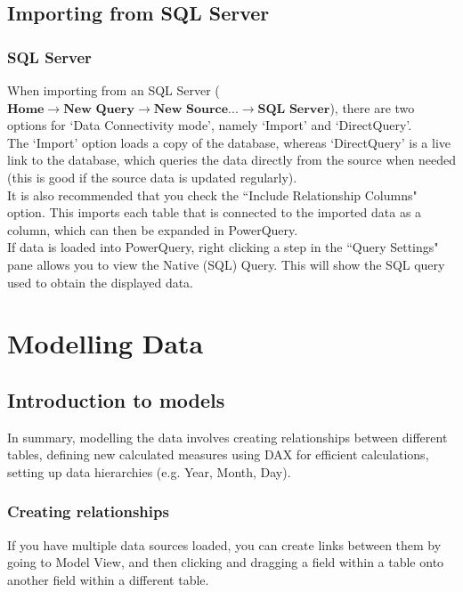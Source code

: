 \documentclass[10pt, openany, twocolumn]{book}
\begin{document}
\section{Importing from SQL Server}

\subsection*{SQL Server}

When importing from an SQL Server ($\textbf{Home} \rightarrow \textbf{New Query} \rightarrow \textbf{New Source...} \rightarrow \textbf{SQL Server}$), there are two options for `Data Connectivity mode', namely `Import' and `DirectQuery'. \\

The `Import' option loads a copy of the database, whereas `DirectQuery' is a live link to the database, which queries the data directly from the source when needed (this is good if the source data is updated regularly). \\

It is also recommended that you check the ``Include Relationship Columns" option. This imports each table that is connected to the imported data as a column, which can then be expanded in PowerQuery.\\

If data is loaded into PowerQuery, right clicking a step in the ``Query Settings" pane allows you to view the Native (SQL) Query. This will show the SQL query used to obtain the displayed data.

\chapter{Modelling Data}

\section{Introduction to models}

In summary, modelling the data involves creating relationships between different tables, defining new calculated measures using DAX for efficient calculations, setting up data hierarchies (e.g. Year, Month, Day).

\subsection*{Creating relationships}

If you have multiple data sources loaded, you can create links between them by going to Model View, and then clicking and dragging a field within a table onto another field within a different table. \\
\end{document}
